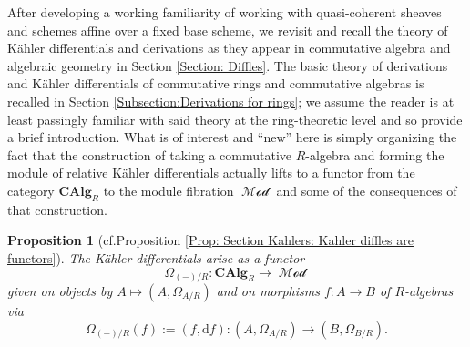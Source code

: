 \documentclass{amsart}
\newtheorem{propx}[thmx]{Proposition}
\theoremstyle{definition}
\DeclareMathOperator{\MMod}{\mathcal{Mod}}
\newcommand{\CAlg}[1]{\mathbf{CAlg}_{#1}}
\newcommand{\Kah}[2]{\Omega_{{#1}/{#2}}}
\numberwithin{equation}{subsection}
\begin{document}
After developing a working familiarity of working with quasi-coherent sheaves and schemes affine over a fixed base scheme, we revisit and recall the theory of K{\"a}hler differentials and derivations as they appear in commutative algebra and algebraic geometry in Section \ref{Section: Diffles}. The basic theory of derivations and K{\"a}hler differentials of commutative rings and commutative algebras is recalled in Section \ref{Subsection:Derivations for rings}; we assume the reader is at least passingly familiar with said theory at the ring-theoretic level and so provide a brief introduction. What is of interest and ``new'' here is simply organizing the fact that the construction of taking a commutative $R$-algebra and forming the module of relative K{\"a}hler differentials actually lifts to a functor from the category $\CAlg{R}$ to the module fibration $\MMod$ and some of the consequences of that construction.
\begin{propx}[{cf.\@ Proposition \ref{Prop: Section Kahlers: Kahler diffles are functors}}]
	The K{\"a}hler differentials arise as a functor
\[
\Kah{(-)}{R}:\CAlg{R} \to \MMod
\]
given on objects by $A \mapsto (A,\Kah{A}{R})$ and on morphisms $f:A \to B$ of $R$-algebras via
\[
\Kah{(-)}{R}(f) := (f,\mathrm{d}f):\left(A,\Kah{A}{R}\right) \to \left(B,\Kah{B}{R}\right).
\]
\end{propx}
\end{document}
